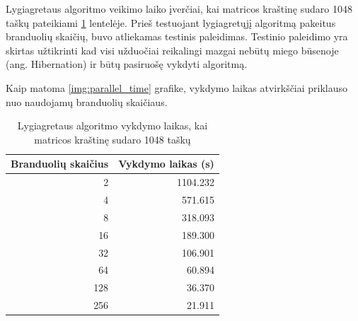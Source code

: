 \documentclass{VUMIFPSbakalaurinis}
\begin{document}
Lygiagretaus algoritmo veikimo laiko įverčiai, kai matricos kraštinę sudaro 1048 taškų pateikiami \ref{table:parallel1048} lentelėje. 
Prieš testuojant lygiagretųjį algoritmą pakeitus branduolių skaičių, buvo atliekamas testinis paleidimas. 
Testinio paleidimo yra skirtas užtikrinti kad visi užduočiai reikalingi mazgai nebūtų miego būsenoje (ang. Hibernation) ir būtų pasiruošę vykdyti algoritmą.

Kaip matoma \ref{img:parallel_time} grafike, vykdymo laikas atvirkščiai priklauso nuo naudojamų branduolių skaičiaus.

\begin{table}[H]
    \begin{tabular}{|r|r|}
        \hline
        \multicolumn{1}{|l|}{Branduolių skaičius} & \multicolumn{1}{|l|}{Vykdymo laikas (s)} \\ \hline
        2                                         & 1104.232                                 \\ \hline
        4                                         & 571.615                                  \\ \hline
        8                                         & 318.093                                  \\ \hline
        16                                        & 189.300                                  \\ \hline
        32                                        & 106.901                                  \\ \hline
        64                                        & 60.894                                   \\ \hline
        128                                       & 36.370                                   \\ \hline
        256                                       & 21.911                                   \\ \hline
    \end{tabular}
    \caption{Lygiagretaus algoritmo vykdymo laikas, kai matricos kraštinę sudaro 1048 taškų}
    \label{table:parallel1048}
\end{table}
\end{document}
